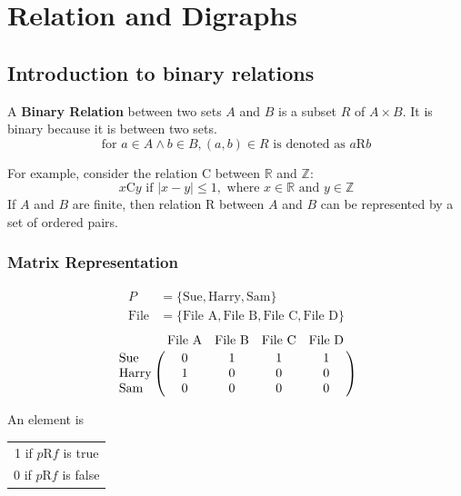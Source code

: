 \section{Relation and Digraphs}

\subsection{Introduction to binary relations}

A \textbf{Binary Relation} between two sets $A$ and $B$ is a subset $R$ of $A \times B$.
It is binary because it is between two sets.
\[
  \text{for } a \in A \land b \in B, (a,b) \in R \text{ is denoted as } a\text{R}b
\]

For example, consider the relation C between $\mathbb{R}$ and $\mathbb{Z}$:
\[
  x\text{C}y \text{ if } \left\lvert x-y\right\rvert \leq 1, \text{ where } x \in \mathbb{R} \text{ and } y \in \mathbb{Z}
\]
If $A$ and $B$ are finite, then relation R between $A$ and $B$ can be represented by a set of ordered pairs.

\subsubsection*{Matrix Representation}
\begin{align*}
  P           & = \{\text{Sue}, \text{Harry}, \text{Sam}\}                       \\
  \text{File} & = \{\text{File A}, \text{File B}, \text{File C}, \text{File D}\}
\end{align*}
\[
  \bordermatrix{ & \text{File A} & \text{File B} & \text{File C} & \text{File D} \cr
    \text{Sue}   & 0 & 1 & 1 & 1 \cr
    \text{Harry} & 1 & 0 & 0 & 0 \cr
    \text{Sam}   & 0 & 0 & 0 & 0 \cr }
\]
\begin{center}
  An element is
  \begin{tabular}{c}
    1 if $p$R$f$ is true \\
    0 if $p$R$f$ is false
  \end{tabular}
\end{center}

